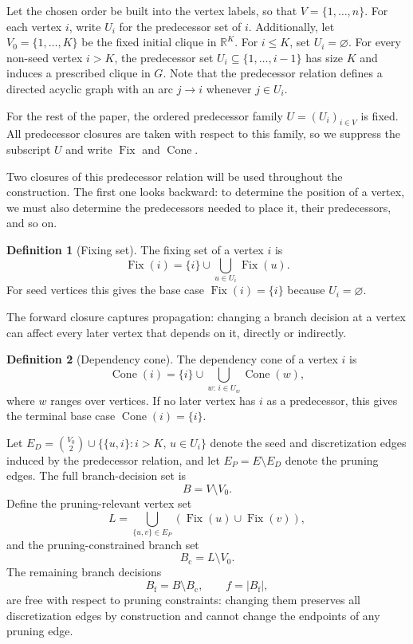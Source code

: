 \documentclass[11pt]{article}
\theoremstyle{plain}
\theoremstyle{definition}
\newtheorem{definition}{Definition}
\begin{document}
Let the chosen order be built into the vertex labels, so that $V=\{1,\ldots,n\}$. For each vertex $i$, write $U_i$ for the predecessor set of $i$. Additionally, let $V_0=\{1,\ldots,K\}$ be the fixed initial clique in $\mathbb{R}^K$. For $i\le K$, set $U_i=\varnothing$. For every non-seed vertex $i > K$, the predecessor set $U_i \subseteq \{1,\ldots,i-1\}$ has size $K$ and induces a prescribed clique in $G$. Note that the predecessor relation defines a directed acyclic graph with an arc $j \to i$ whenever $j \in U_i$.

For the rest of the paper, the ordered predecessor family $U=(U_i)_{i\in V}$ is fixed. All predecessor closures are taken with respect to this family, so we suppress the subscript $U$ and write $\operatorname{Fix}$ and $\operatorname{Cone}$.

Two closures of this predecessor relation will be used throughout the construction. The first one looks backward: to determine the position of a vertex, we must also determine the predecessors needed to place it, their predecessors, and so on.

\begin{definition}[Fixing set]
\label{def:fixing}
The fixing set of a vertex $i$ is
\[
\operatorname{Fix}(i)
=
\{i\}\cup \bigcup_{u\in U_i}\operatorname{Fix}(u).
\]
For seed vertices this gives the base case $\operatorname{Fix}(i)=\{i\}$ because $U_i=\varnothing$.
\end{definition}

The forward closure captures propagation: changing a branch decision at a vertex can affect every later vertex that depends on it, directly or indirectly.

\begin{definition}[Dependency cone]
\label{def:cone}
The dependency cone of a vertex $i$ is
\[
\operatorname{Cone}(i)
=
\{i\}\cup \bigcup_{w:\,i\in U_w}\operatorname{Cone}(w),
\]
where $w$ ranges over vertices. If no later vertex has $i$ as a predecessor, this gives the terminal base case $\operatorname{Cone}(i)=\{i\}$.
\end{definition}

Let $E_D = \binom{V_0}{2} \cup \{\{u,i\} : i>K,\, u \in U_i\}$ denote the seed and discretization edges induced by the predecessor relation, and let $E_P = E\setminus E_D$ denote the pruning edges. The full branch-decision set is
\[
B = V\setminus V_0.
\]
Define the pruning-relevant vertex set
\[
L
=
\bigcup_{\{u,v\}\in E_P}
\left(\operatorname{Fix}(u)\cup \operatorname{Fix}(v)\right),
\]
and the pruning-constrained branch set
\[
B_{\mathrm{c}}=L\setminus V_0.
\]
The remaining branch decisions
\[
B_{\mathrm{f}}=B\setminus B_{\mathrm{c}},
\qquad
f=\lvert B_{\mathrm{f}}\rvert,
\]
are free with respect to pruning constraints: changing them preserves all discretization edges by construction and cannot change the endpoints of any pruning edge.
\end{document}
